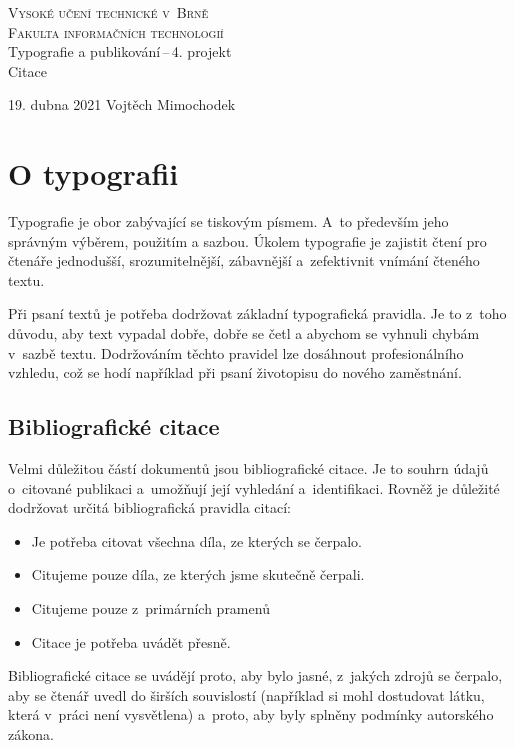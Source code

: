 \documentclass[11pt, a4paper]{article}
\begin{document}
	
\begin{titlepage}
\begin{center}
{\Huge
\textsc{Vysoké učení technické v~Brně\\[0.4em]}}
{\huge \textsc{Fakulta informačních technologií}}\\
{\Large
Typografie a publikování\,--\,4. projekt\\[0.3em]
\Huge{Citace}
}
	
\end{center}
		
{\Large 19. dubna 2021 \hfill Vojtěch Mimochodek}
\end{titlepage}

\section{O typografii}
Typografie je obor zabývající se tiskovým písmem. A~to především jeho správným výběrem, použitím a sazbou. Úkolem typografie je zajistit čtení pro čtenáře jednodušší, srozumitelnější, zábavnější a~zefektivnit vnímání čteného textu.
\cite{strafelda}

Při psaní textů je potřeba dodržovat základní typografická pravidla. Je to z~toho důvodu, aby text vypadal dobře, dobře se četl a abychom se vyhnuli chybám v~sazbě textu. Dodržováním těchto pravidel lze dosáhnout profesionálního vzhledu, což se hodí například při psaní životopisu do nového zaměstnání.
\cite{Horny}

\subsection{Bibliografické citace}
Velmi důležitou částí dokumentů jsou bibliografické citace. Je to souhrn údajů o~citované publikaci a~umožňují její vyhledání a~identifikaci. Rovněž je důležité dodržovat určitá bibliografická pravidla citací:
\begin{itemize}
\item Je potřeba citovat všechna díla, ze kterých se čerpalo.
\item Citujeme pouze díla, ze kterých jsme skutečně čerpali.
\item Citujeme pouze z~primárních pramenů
\item Citace je potřeba uvádět přesně.
\end{itemize}

Bibliografické citace se uvádějí proto, aby bylo jasné, z~jakých zdrojů se čerpalo, aby se čtenář uvedl do širších souvislostí (například si mohl dostudovat látku, která v~práci není vysvětlena) a~proto, aby byly splněny podmínky autorského zákona.
\cite{bibCitace}
\end{document}
